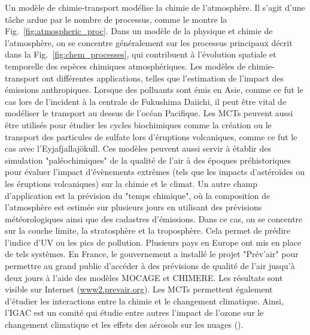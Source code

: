 Un modèle de chimie-transport modélise la chimie de l'atmosphère. Il s'agit
d'une tâche ardue par le nombre de processus, comme le montre la
Fig.~\ref{fig:atmospheric_proc}. Dans un modèle de la physique et chimie de
l'atmosphère, on se concentre généralement sur les processus principaux décrit
dans la Fig.~\ref{fig:chem_processes}, qui contribuent à l'évolution spatiale et
temporelle des espèces chimiques atmosphériques. Les modèles de chimie-transport
ont différentes applications, telles que l'estimation de l'impact des émissions
anthropiques. Lorsque des polluants sont émis en Asie, comme ce fut le cas
lors de l'incident à la centrale de Fukushima Daiichi, il peut être vital de
modéliser le transport au dessus de l'océan Pacifique. Les MCTs peuvent aussi
être utilisés pour étudier les cycles biochimiques comme la création ou le
transport des particules de sulfate lors d'éruptions volcaniques, comme ce fut
le cas avec l'Eyjafjallaj\"okull. Ces modèles peuvent aussi servir à établir des
simulation "paléochimiques" de la qualité de l'air à des époques préhistoriques
pour évaluer l'impact d'évènements extrêmes (tels que les impacts d'astéroïdes ou
les éruptions volcaniques) sur la chimie et le climat. Un autre champ
d'application est la prévision du "temps chimique", où la composition de
l'atmosphère est estimée sur plusieurs jours en utilisant des prévisions
météorologiques ainsi que des cadastres d'émissions. Dans ce cas, on se
concentre sur la couche limite, la stratosphère et la troposphère. Cela permet
de prédire l'indice d'UV ou les pics de pollution. Plusieurs pays en Europe ont
mis en place de tels systèmes. En France, le gouvernement a installé le projet
"Prév'air" pour permettre au grand public d'accéder à des prévisions de qualité
de l'air jusqu'à deux jours à l'aide des modèles MOCAGE et CHIMERE.  Les
résultats sont visible sur Internet (\url{www2.prevair.org}). Les MCTs
permettent également d'étudier les interactions entre la chimie et le changement
climatique. Ainsi, l'IGAC est un comité qui étudie entre autres l'impact de
l'ozone sur le changement climatique et les effets des aérosols sur les nuages
(\cite{IGAC2006}).

